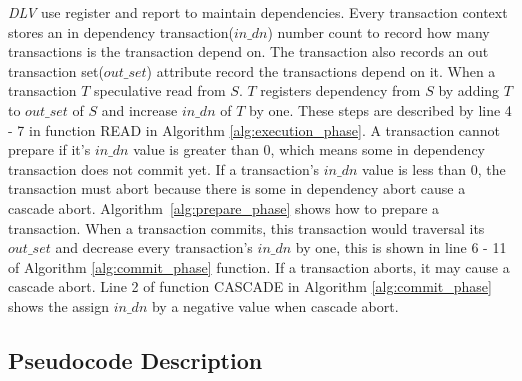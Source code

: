 \documentclass[conference]{IEEEtran}
\begin{document}
\emph{DLV} use register and report\cite{HeckatonMVCC:journals/pvldb/LarsonBDFPZ11} to maintain dependencies.
Every transaction context stores an in dependency transaction(${in\_dn}$) number count to record how many transactions is the transaction depend on.
The transaction also records an out transaction set(${out\_set}$) attribute record the transactions depend on it.
When a transaction ${T}$ speculative read from ${S}$.
${T}$ registers dependency from ${S}$ by adding ${T}$ to ${out\_set}$ of ${S}$ and increase ${in\_dn}$ of ${T}$ by one.
These steps are described by line 4 - 7 in function READ in Algorithm \ref{alg:execution_phase}.
A transaction cannot prepare if it's ${in\_dn}$ value is greater than 0, which means some in dependency transaction does not commit yet.
If a transaction's ${in\_dn}$ value is less than 0, the transaction must abort because there is some in dependency abort cause a cascade abort.
Algorithm~\ref{alg:prepare_phase} shows how to prepare a transaction.
When a transaction commits, this transaction would traversal its ${out\_set}$ and decrease every transaction's ${in\_dn}$ by one, this is shown in line 6 - 11 of Algorithm \ref{alg:commit_phase} function.
If a transaction aborts, it may cause a cascade abort.
Line 2 of function CASCADE in Algorithm \ref{alg:commit_phase} shows the assign ${in\_dn}$ by a negative value when cascade abort.

\subsection{Pseudocode Description}
\end{document}
